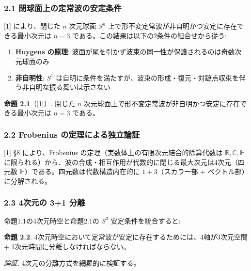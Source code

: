 \documentclass[
  a4paper,11pt]{ltjsarticle}
\begin{document}
\subsubsection{2.1
閉球面上の定常波の安定条件}\label{ux9589ux7403ux9762ux4e0aux306eux5b9aux5e38ux6ce2ux306eux5b89ux5b9aux6761ux4ef6}

{[}1{]} により、閉じた \(n\) 次元球面 \(S^n\)
上で形不変定常波が非自明かつ安定に存在できる最小次元は \(n = 3\)
である。この結果は以下の2条件の組合せから従う:

\begin{enumerate}
\def\labelenumi{(\roman{enumi})}
\item
  \textbf{Huygens の原理}:
  波面が尾を引かず波束の同一性が保護されるのは奇数次元球面のみ
\item
  \textbf{非自明性}: \(S^1\)
  は自明に条件を満たすが、波束の形成・復元・対蹠点収束を伴う非自明な振る舞いは示さない
\end{enumerate}

\textbf{命題 2.1}（{[}1{]}）. 閉じた \(n\)
次元球面上で形不変定常波が非自明かつ安定に存在できる最小次元は \(n = 3\)
である。

\subsubsection{2.2 Frobenius
の定理による独立論証}\label{frobenius-ux306eux5b9aux7406ux306bux3088ux308bux72ecux7acbux8ad6ux8a3c}

{[}1{]} §8 により、Frobenius の定理（実数体上の有限次元結合的除算代数は
\(\mathbb{R}, \mathbb{C}, \mathbb{H}\)
に限られる）から、波の合成・相互作用が代数的に閉じる最大次元は4次元（四元数
\(\mathbb{H}\)）である。四元数は代数構造内在的に \(1 + 3\)（スカラー部 +
ベクトル部）に分解される。

\subsubsection{2.3 4次元の 3+1
分離}\label{ux6b21ux5143ux306e-31-ux5206ux96e2}

命題1.1の4次元時空と命題2.1の \(S^3\) 安定条件を統合すると:

\textbf{命題 2.2}.
4次元時空において定常波が安定に存在するためには、4軸が3次元空間 +
1次元時間に分離しなければならない。

\emph{論証}. 4次元の分離方式を網羅的に検証する。
\end{document}

